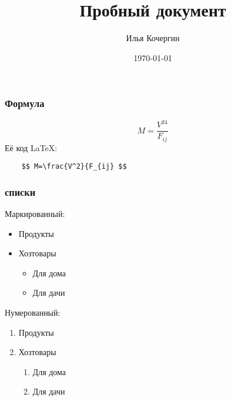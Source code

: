 \documentclass{beamer}
\author{Илья Кочергин}
\title{Пробный документ}
\date{\today}
\institute{экономический факультет МГУ}
\begin{document}
  
\begin{frame}
 \titlepage	
\end{frame}  

\begin{frame}[fragile]
\frametitle{Формула}
 $$ M=\frac{V^{24}}{F_{ij}} $$
	Её код \LaTeX{}:
	\begin{verbatim}
	$$ M=\frac{V^2}{F_{ij} $$
	\end{verbatim}	
	
\end{frame}  

\begin{frame}
	\frametitle{списки}
Маркированный:	
	\begin{itemize}
		\item Продукты
		\item Хозтовары
		\begin{itemize}
			\item Для дома 
			\item Для дачи
		\end{itemize}
	\end{itemize}	
Нумерованный:
	\begin{enumerate}
		\item Продукты
		\item Хозтовары
		
		\begin{enumerate}
			\item Для дома 
			\item Для дачи
		\end{enumerate}
		
		
	\end{enumerate}
	
\end{frame}
\end{document}
